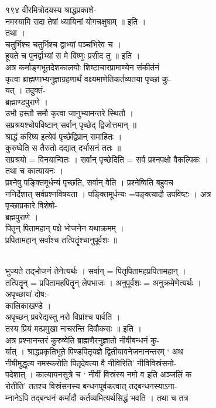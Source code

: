\documentclass[11pt, openany]{book}
\begin{document}
{{%


{१९४ वीरमित्रोदयस्य श्राद्धप्रकाशे-}{\\
नमस्यामि सदा तेषां ध्यायिनां योगचक्षुषाम् ॥ इति ।\\
तथा ।\\
चतुर्भिश्च चतुर्भिश्च द्वाभ्यां पञ्चभिरेव च ।\\
हूयते च पुनर्द्वाभ्यां स मे विष्णुः प्रसीद तु ॥ इति ।\\
अत्र कर्माङ्गभूतदेशकालयोः शिष्टाचारप्रामाण्येन संकीर्तनं\\
कृत्वा ब्राह्मणाभ्यनुज्ञाग्रहणार्थं वक्ष्यमाणेतिकर्तव्यतया पृच्छां कु-\\
यत् । तदुक्तं-\\
ब्रह्माण्डपुराणे ।\\
उभौ हस्तौ समौ कृत्वा जानुभ्यामन्तरे स्थितौ ।\\
सप्रश्रयश्चोपविष्टान् सर्वान् पृच्छेद् द्विजोत्तमान् ॥\\
श्राद्धं करिष्य इत्येवं पृच्छेद्विप्रान् समाहितः ।\\
कुरुष्वेति स तैरुतो दद्यात् दर्भासनं ततः }{॥}{\\
सप्रश्रयो = विनयान्वितः । सर्वान् पृच्छेदिति = सर्व प्रश्नपक्षो
वैकल्पिकः ।\\
तथा च कात्यायनः ।\\
प्रश्नेषु पङ्क्तिमूर्धन्यं पृच्छति, सर्वान् वेति । प्रश्नेष्विति बहुवच\\
ननिर्देशात् सर्वप्रश्नविषयता । पङ्क्तिमूर्धन्यः =पङ्क्त्यादौ
उपविष्टः । अत्र\\
पृच्छाप्रकारे विशेषो-\\
ब्रह्मपुराणे ।\\
पितॄन् पितामहान् पक्षे भोजनेन यथाक्रमम् ।\\
प्रपितामहान् सर्वांश्च तत्पितॄंश्चानुपूर्वशः }{॥}{\\
भुज्यते तद्भोजनं तेनेत्यर्थः । सर्वान् = पितृपितामहप्रपितामहान् ।\\
तत्पितॄन् = प्रपितामहपितॄन् लेपभाजः । अनुपूर्वशः = अनुक्रमेणेत्यर्थः ।\\
अपृच्छायां दोष:-\\
कालिकाखण्डे ।\\
अपृच्छन् प्रवरेद्यस्तु नरो विप्रांश्च पार्वति ।\\
तस्य प्रियं मत्प्रमुखा नाचरन्ति दिवौकसः ॥ इति ।\\
अत्र प्रश्नानन्तरं कुरुष्वेति ब्राह्मणैरनुज्ञातो नीवीबन्धनं कु-\\
र्यात् । श्राद्धप्रकृतिभूते पिण्डपितृयज्ञे द्वितीयावनेजनानन्तरम् ` अथ\\
नीषीमुद्धृत्य नमस्करोति पितृदेवत्या वै नीविरिति' नीविविस्रंसनो-\\
पदेशात् । कात्यायनसूत्रे च ` नीवीं विस्रंस्य नमो व इति अञ्जलिं क\\
रोतीति' ततश्च विस्रंसनस्य बन्धनपूर्वकत्वात् तद्बन्धनस्याऽना-\\
म्नानेऽपि तद्बन्धनं कर्मादौ कर्तव्यमित्यर्थसिद्धं भवति । तथा च तत्र

}}}
\end{document}
